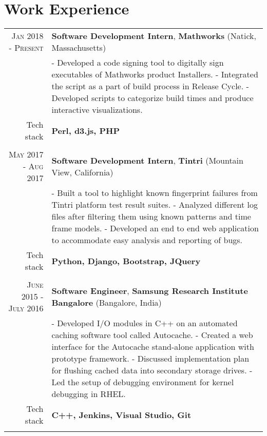 \section {Work Experience}
\renewcommand{\arraystretch}{0.95}%
\begin{tabular}{r|p{14cm}}

\textsc {Jan 2018 - Present} & \textbf{Software Development Intern}, \textbf{Mathworks} (Natick, Massachusetts)\\
& \small{
- Developed a code signing tool to digitally sign executables of Mathworks product Installers. \newline
- Integrated the script as a part of build process in Release Cycle.\newline
- Developed scripts to categorize build times and produce interactive visualizations.} \\
\small{Tech stack} &\footnotesize{\textbf{Perl, d3.js, PHP}} \\
\multicolumn{2}{c}{} \\

\textsc {May 2017 - Aug 2017} & \textbf{Software Development Intern}, \textbf{Tintri} (Mountain View, California)\\
& \small{
- Built a tool to highlight known fingerprint failures from Tintri platform test result suites. \newline
- Analyzed different log files after filtering them using known patterns and time frame models.\newline
- Developed an end to end web application to accommodate easy analysis and reporting of bugs.} \\
\small{Tech stack} &\footnotesize{\textbf{Python, Django, Bootstrap, JQuery}} \\
\multicolumn{2}{c}{} \\

\textsc {June 2015 - July 2016} & \textbf{Software Engineer}, \textbf{Samsung Research Institute Bangalore} (Bangalore, India) \\
& \small{
- Developed I/O modules in C++ on an automated caching software tool called Autocache.\newline
- Created a web interface for the Autocache stand-alone application with prototype framework.\newline
- Discussed implementation plan for flushing cached data into secondary storage drives.\newline
- Led the setup of debugging environment for kernel debugging in RHEL.}\\
\small{Tech stack} &\footnotesize{\textbf{C++, Jenkins, Visual Studio, Git}} \\
\multicolumn{2}{c}{} \\



\end{tabular}
